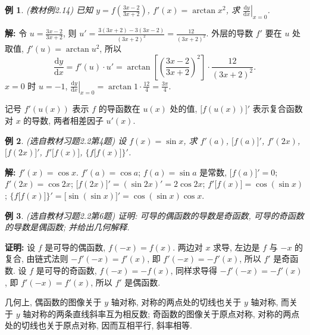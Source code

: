 \documentclass[UTF8,openany]{ctexbook}
\theoremstyle{chinesetextbook}
\newtheorem{example}{例}[section]
\newenvironment{cnproof}{\par\indent\textbf{证明:} \ignorespaces}{\par}
\newenvironment{cnsolution}{\par\indent\textbf{解:} \ignorespaces}{\par}
\newcommand{\dd}{\mathrm d}
\begin{document}
\begin{example}\label{ex:c2-2-14}
\textnormal{(教材例2.14)} 已知 $\displaystyle y=f\left(\frac{3x-2}{3x+2}\right)$, $f'(x)=\arctan x^2$, 求 $\displaystyle\left.\frac{\dd y}{\dd x}\right|_{x=0}$.
\end{example}
\begin{cnsolution}
令 $\displaystyle u=\frac{3x-2}{3x+2}$, 则 $\displaystyle u'=\frac{3(3x+2)-3(3x-2)}{(3x+2)^2}=\frac{12}{(3x+2)^2}$. 外层的导数 $f'$ 要在 $u$ 处取值, $f'(u)=\arctan u^2$, 所以
\[
\frac{\dd y}{\dd x}=f'(u)\cdot u'=\arctan\left[\left(\frac{3x-2}{3x+2}\right)^2\right]\cdot\frac{12}{(3x+2)^2}.
\]
$x=0$ 时 $u=-1$, $\displaystyle\left.\frac{\dd y}{\dd x}\right|_{x=0}=\arctan1\cdot\frac{12}4=\frac{3\pi}4$.
\end{cnsolution}
记号 $f'(u(x))$ 表示 $f$ 的导函数在 $u(x)$ 处的值, $\bigl[f(u(x))\bigr]'$ 表示复合函数对 $x$ 的导数, 两者相差因子 $u'(x)$.
\begin{example}\label{ex:c2-h2-4}
\textnormal{(选自教材习题2.2第4题)} 设 $f(x)=\sin x$, 求 $f'(a)$, $\bigl[f(a)\bigr]'$, $f'(2x)$, $\bigl[f(2x)\bigr]'$, $f'\bigl[f(x)\bigr]$, $\bigl\{f\bigl[f(x)\bigr]\bigr\}'$.
\end{example}
\begin{cnsolution}
$f'(x)=\cos x$. $f'(a)=\cos a$; $f(a)=\sin a$ 是常数, $\bigl[f(a)\bigr]'=0$; $f'(2x)=\cos2x$; $\bigl[f(2x)\bigr]'=(\sin2x)'=2\cos2x$; $f'\bigl[f(x)\bigr]=\cos(\sin x)$; $\bigl\{f\bigl[f(x)\bigr]\bigr\}'=\bigl[\sin(\sin x)\bigr]'=\cos(\sin x)\cos x$.
\end{cnsolution}
\begin{example}\label{ex:c2-h2-6}
\textnormal{(选自教材习题2.2第6题)} 证明: 可导的偶函数的导数是奇函数, 可导的奇函数的导数是偶函数; 并给出几何解释.
\end{example}
\begin{cnproof}
设 $f$ 是可导的偶函数, $f(-x)=f(x)$. 两边对 $x$ 求导, 左边是 $f$ 与 $-x$ 的复合, 由链式法则 $-f'(-x)=f'(x)$, 即 $f'(-x)=-f'(x)$, 所以 $f'$ 是奇函数. 设 $f$ 是可导的奇函数, $f(-x)=-f(x)$, 同样求导得 $-f'(-x)=-f'(x)$, 即 $f'(-x)=f'(x)$, 所以 $f'$ 是偶函数.
\end{cnproof}
几何上, 偶函数的图像关于 $y$ 轴对称, 对称的两点处的切线也关于 $y$ 轴对称, 而关于 $y$ 轴对称的两条直线斜率互为相反数; 奇函数的图像关于原点对称, 对称的两点处的切线也关于原点对称, 因而互相平行, 斜率相等.
\end{document}
